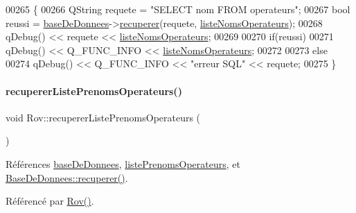 \begin{DoxyCode}
00265 \{
00266     QString requete = \textcolor{stringliteral}{"SELECT nom FROM operateurs"};
00267     \textcolor{keywordtype}{bool} reussi = \hyperlink{class_rov_a5a9a824cd100947c75d0951eb9e1f90c}{baseDeDonnees}->\hyperlink{class_base_de_donnees_a77539baad389f5acf754cd2cd452403e}{recuperer}(requete, 
      \hyperlink{class_rov_a3d424033e0ff00f480a711358ef4fde6}{listeNomsOperateurs});
00268     qDebug() << requete << \hyperlink{class_rov_a3d424033e0ff00f480a711358ef4fde6}{listeNomsOperateurs};
00269 
00270     \textcolor{keywordflow}{if}(reussi)
00271         qDebug() << Q\_FUNC\_INFO << \hyperlink{class_rov_a3d424033e0ff00f480a711358ef4fde6}{listeNomsOperateurs};
00272 
00273     \textcolor{keywordflow}{else}
00274         qDebug() << Q\_FUNC\_INFO << \textcolor{stringliteral}{"erreur SQL"} << requete;
00275 \}
\end{DoxyCode}
\mbox{\label{class_rov_a84dece742f5c4c903ada4f25c869597f}} 
\paragraph{\texorpdfstring{recuperer\+Liste\+Prenoms\+Operateurs()}{recupererListePrenomsOperateurs()}}
{\footnotesize\ttfamily void Rov\+::recuperer\+Liste\+Prenoms\+Operateurs (\begin{DoxyParamCaption}{ }\end{DoxyParamCaption})\hspace{0.3cm}{\ttfamily [private]}}



Références \hyperlink{class_rov_a5a9a824cd100947c75d0951eb9e1f90c}{base\+De\+Donnees}, \hyperlink{class_rov_a1e059749c13ed4ee9c0ec9168e79a3be}{liste\+Prenoms\+Operateurs}, et \hyperlink{class_base_de_donnees_a77539baad389f5acf754cd2cd452403e}{Base\+De\+Donnees\+::recuperer()}.



Référencé par \hyperlink{class_rov_a5dddd3bd156c134848078296087d090c}{Rov()}.


